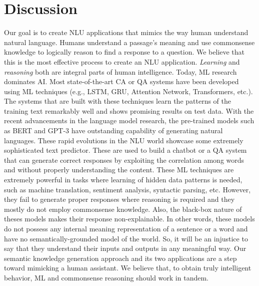 \documentclass[letterpaper]{article}
\begin{document}
\section{Discussion}

Our goal is to create NLU applications that mimics the way human understand natural language. Humans understand a passage's meaning and use commonsense knowledge to logically reason to find a response to a question. We believe that this is the most effective process to create an NLU application. \textit{Learning} and \textit{reasoning} both are integral parts of human intelligence. Today, ML research dominates AI. Most state-of-the-art CA or QA systems have been developed using ML techniques (e.g., LSTM, GRU, Attention Network, Transformers, etc.). The systems that are built with these  techniques learn the patterns of the training text remarkably well and shows promising results on test data. With the recent advancements in the language model research, the pre-trained models such as BERT \cite{bert} and GPT-3 \cite{gpt3} have outstanding capability of generating natural languages. These rapid evolutions in the NLU world showcase some extremely sophisticated text predictor. These are used to build a chatbot or a QA system that can generate correct responses by exploiting the correlation among words and without properly understanding the content. These ML techniques are extremely powerful in tasks where learning of hidden data patterns is needed, such as machine translation, sentiment analysis, syntactic parsing, etc. However, they fail to generate proper responses where reasoning is required and they mostly do not employ commonsense knowledge. Also, the black-box nature of theses models makes their response non-explainable. In other words, these models do not possess any internal meaning representation of a sentence or a word and have no semantically-grounded model of the world. So, it will be an injustice to say that they understand their inputs and outputs in any meaningful way. Our semantic knowledge generation approach and its two applications are a step toward mimicking a human assistant. We believe that, to obtain truly intelligent behavior, ML and commonsense reasoning should work in tandem.  
\end{document}
